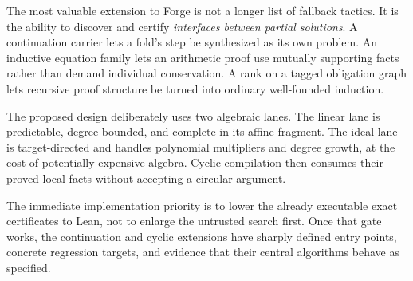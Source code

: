 The most valuable extension to Forge is not a longer list of fallback tactics.
It is the ability to discover and certify \emph{interfaces between partial
solutions}. A continuation carrier lets a fold's step be synthesized as its own
problem. An inductive equation family lets an arithmetic proof use mutually
supporting facts rather than demand individual conservation. A rank on a tagged
obligation graph lets recursive proof structure be turned into ordinary
well-founded induction.

The proposed design deliberately uses two algebraic lanes. The linear lane is
predictable, degree-bounded, and complete in its affine fragment. The ideal lane
is target-directed and handles polynomial multipliers and degree growth, at the
cost of potentially expensive algebra. Cyclic compilation then consumes their
proved local facts without accepting a circular argument.

The immediate implementation priority is to lower the already executable exact
certificates to Lean, not to enlarge the untrusted search first. Once that gate
works, the continuation and cyclic extensions have sharply defined entry points,
concrete regression targets, and evidence that their central algorithms behave
as specified.
